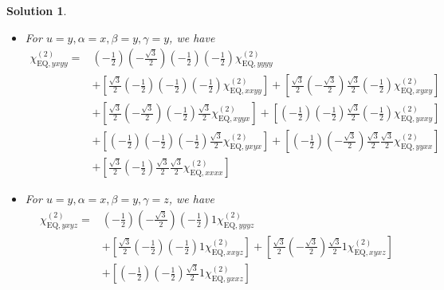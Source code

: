 \documentclass[UTF8,10pt,a4paper]{article}
\theoremstyle{Problem}
\theoremstyle{Solution}
\newtheorem*{sol}{Solution}
\begin{document}
\begin{sol}
\begin{itemize}
\begin{align}
&+\left[\frac{\sqrt{3}}{2}\left(-\frac{1}{2}\right)\frac{\sqrt{3}}{2}\left(-\frac{1}{2}\right)\chi_{\text{EQ},xxxx}^{(2)}\right]
\end{align}\normalsize
\item For $u=y,\alpha=x,\beta=y,\gamma=y$, we have
\footnotesize\begin{align}
\nonumber\chi_{\text{EQ},yxyy}^{(2)}=&\left(-\frac{1}{2}\right)\left(-\frac{\sqrt{3}}{2}\right)\left(-\frac{1}{2}\right)\left(-\frac{1}{2}\right)\chi_{\text{EQ},yyyy}^{(2)}\\
\nonumber&+\left[\frac{\sqrt{3}}{2}\left(-\frac{1}{2}\right)\left(-\frac{1}{2}\right)\left(-\frac{1}{2}\right)\chi_{\text{EQ},xxyy}^{(2)}\right]+\left[\frac{\sqrt{3}}{2}\left(-\frac{\sqrt{3}}{2}\right)\frac{\sqrt{3}}{2}\left(-\frac{1}{2}\right)\chi_{\text{EQ},xyxy}^{(2)}\right]\\
\nonumber&+\left[\frac{\sqrt{3}}{2}\left(-\frac{\sqrt{3}}{2}\right)\left(-\frac{1}{2}\right)\frac{\sqrt{3}}{2}\chi_{\text{EQ},xyyx}^{(2)}\right]+\left[\left(-\frac{1}{2}\right)\left(-\frac{1}{2}\right)\frac{\sqrt{3}}{2}\left(-\frac{1}{2}\right)\chi_{\text{EQ},yxxy}^{(2)}\right]\\
\nonumber&+\left[\left(-\frac{1}{2}\right)\left(-\frac{1}{2}\right)\left(-\frac{1}{2}\right)\frac{\sqrt{3}}{2}\chi_{\text{EQ},yxyx}^{(2)}\right]+\left[\left(-\frac{1}{2}\right)\left(-\frac{\sqrt{3}}{2}\right)\frac{\sqrt{3}}{2}\frac{\sqrt{3}}{2}\chi_{\text{EQ},yyxx}^{(2)}\right]\\
&+\left[\frac{\sqrt{3}}{2}\left(-\frac{1}{2}\right)\frac{\sqrt{3}}{2}\frac{\sqrt{3}}{2}\chi_{\text{EQ},xxxx}^{(2)}\right]
\end{align}\normalsize
\item For $u=y,\alpha=x,\beta=y,\gamma=z$, we have
\footnotesize\begin{align}
\nonumber\chi_{\text{EQ},yxyz}^{(2)}=&\left(-\frac{1}{2}\right)\left(-\frac{\sqrt{3}}{2}\right)\left(-\frac{1}{2}\right)1\chi_{\text{EQ},yyyz}^{(2)}\\
\nonumber&+\left[\frac{\sqrt{3}}{2}\left(-\frac{1}{2}\right)\left(-\frac{1}{2}\right)1\chi_{\text{EQ},xxyz}^{(2)}\right]+\left[\frac{\sqrt{3}}{2}\left(-\frac{\sqrt{3}}{2}\right)\frac{\sqrt{3}}{2}1\chi_{\text{EQ},xyxz}^{(2)}\right]\\
\nonumber&+\left[\left(-\frac{1}{2}\right)\left(-\frac{1}{2}\right)\frac{\sqrt{3}}{2}1\chi_{\text{EQ},yxxz}^{(2)}\right]\\
\nonumber&\\
&
\end{align}\normalsize

\end{itemize}
\end{sol}
\end{document}
